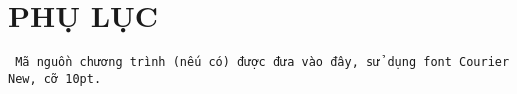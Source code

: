 \section*{PHỤ LỤC}
\texttt{
\fontsize{10pt}{0pt}\selectfont Mã nguồn chương trình (nếu có) được đưa vào đây, sử dụng font Courier New, cỡ 10pt.}
